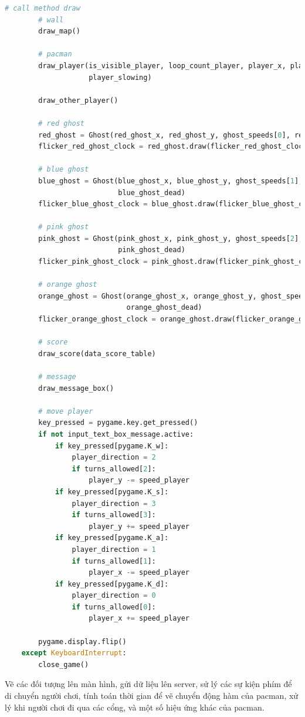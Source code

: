 \documentclass[a4paper]{article}
\begin{document}
\begin{lstlisting}[language=Python]
        # call method draw
        # wall
        draw_map()

        # pacman
        draw_player(is_visible_player, loop_count_player, player_x, player_y, player_direction, nick_name,
                    player_slowing)

        draw_other_player()

        # red ghost
        red_ghost = Ghost(red_ghost_x, red_ghost_y, ghost_speeds[0], red_ghost_image, red_ghost_direction, red_ghost_dead)
        flicker_red_ghost_clock = red_ghost.draw(flicker_red_ghost_clock)

        # blue ghost
        blue_ghost = Ghost(blue_ghost_x, blue_ghost_y, ghost_speeds[1], blue_ghost_image, blue_ghost_direction,
                           blue_ghost_dead)
        flicker_blue_ghost_clock = blue_ghost.draw(flicker_blue_ghost_clock)

        # pink ghost
        pink_ghost = Ghost(pink_ghost_x, pink_ghost_y, ghost_speeds[2], pink_ghost_image, pink_ghost_direction,
                           pink_ghost_dead)
        flicker_pink_ghost_clock = pink_ghost.draw(flicker_pink_ghost_clock)

        # orange ghost
        orange_ghost = Ghost(orange_ghost_x, orange_ghost_y, ghost_speeds[3], orange_ghost_image, orange_ghost_direction,
                             orange_ghost_dead)
        flicker_orange_ghost_clock = orange_ghost.draw(flicker_orange_ghost_clock)

        # score
        draw_score(data_score_table)

        # message
        draw_message_box()

        # move player
        key_pressed = pygame.key.get_pressed()
        if not input_text_box_message.active:
            if key_pressed[pygame.K_w]:
                player_direction = 2
                if turns_allowed[2]:
                    player_y -= speed_player
            if key_pressed[pygame.K_s]:
                player_direction = 3
                if turns_allowed[3]:
                    player_y += speed_player
            if key_pressed[pygame.K_a]:
                player_direction = 1
                if turns_allowed[1]:
                    player_x -= speed_player
            if key_pressed[pygame.K_d]:
                player_direction = 0
                if turns_allowed[0]:
                    player_x += speed_player

        pygame.display.flip()
    except KeyboardInterrupt:
        close_game()
\end{lstlisting}
Vẽ các đối tượng lên màn hình, gửi dữ liệu lên server, sử lý các sự kiện phím để di chuyển người chơi, tính toán thời gian để vẽ chuyển động hàm của pacman, xử lý khi người chơi đi qua các cổng, và một số hiệu ứng khác của pacman.
\end{document}
